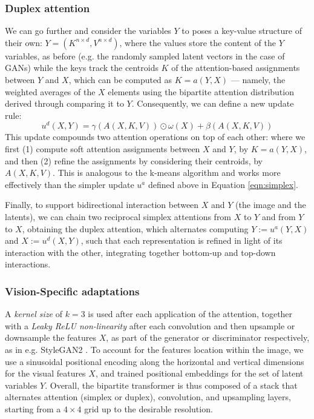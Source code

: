 \documentclass{article}
\begin{document}
	\subsubsection{Duplex attention}
	
	We can go further and consider the variables $Y$ to poses a key-value structure of their own: $Y = 
	(K^{n\times d} , V^{n\times d})$, where the values store the content of the $Y$ variables, as before 
	(e.g. the randomly sampled latent vectors in the case of GANs) while the keys track the centroids 
	$K$ of the attention-based assignments between $Y$ and $X$, which can be computed as $K = a(Y, 
	X)$ — namely, the weighted averages of the $X$ elements using the bipartite attention distribution 
	derived through comparing it to $Y$. Consequently, we can define a new update rule:
	\begin{equation}
		\label{eqn:duplex}
		u^d(X, Y )=\gamma (A(X, K, V)) \odot \omega (X) + \beta (A(X, K, V))
	\end{equation}
	This update compounds two attention operations on top of each other: where we first (1) compute 
	soft attention assignments between $X$ and $Y$, by $K = a(Y, X)$, and then (2) refine the 
	assignments by considering their centroids, by $A(X, K, V)$. This is analogous to the k-means 
	algorithm and works more effectively than the simpler update $u^a$ defined above in Equation 
	\eqref{eqn:simplex}.
	
	Finally, to support bidirectional interaction between $X$ and $Y$ (the image and the latents), we can 
	chain two reciprocal simplex attentions from $X$ to $Y$ and from $Y$ to $X$, obtaining the duplex 
	attention, which alternates computing $Y :=u^a(Y,X)$ and $X:=u^d(X,Y)$, such that each 
	representation is refined in light of its interaction with the other, integrating together bottom-up and 
	top-down interactions.
	
	\subsubsection{Vision-Specific adaptations}
	A \textit{kernel size} of $k = 3$ is used after each application of the attention, together with a 
	\textit{Leaky ReLU non-linearity} after each convolution and then upsample or downsample the 
	features $X$, as part of the generator or discriminator respectively, as in e.g. StyleGAN2 
	\cite{karras2020analyzing}. 
	To account for the features location within the image, we use a sinusoidal positional encoding along 
	the horizontal and vertical dimensions for the visual features $X$, and trained positional 
	embeddings for the set of latent variables $Y$.
	Overall, the bipartite transformer is thus composed of a stack that alternates attention (simplex or 
	duplex), convolution, and upsampling layers, starting from a $4 \times 4$ grid up to the desirable 
	resolution. 
	
\end{document}
